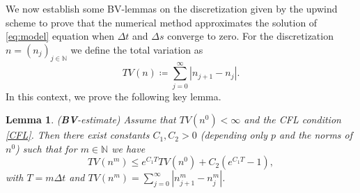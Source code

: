\documentclass[11pt,a4paper]{article}
\newcommand{\N}{\mathbb{N}}
\newtheorem{lemma}{Lemma}[section]
\begin{document}
We now establish some BV-lemmas on the discretization given by the upwind scheme to prove that the numerical method approximates the solution of \eqref{eq:model} equation when $\Delta t$ and $\Delta s$ converge to zero. For the discretization $n=(n_j)_{j\in\N}$ we define the total variation as
\begin{equation}
  TV(n)\coloneqq\sum_{j=0}^{\infty}|n_{j+1}-n_j|.  
\end{equation}
In this context, we prove the following key lemma.

\begin{lemma}{(\textbf{BV}-estimate)}
\label{BV-lem}
Assume that $TV(n^0)<\infty$ and the CFL condition \eqref{CFL}. Then there exist constants $C_1,C_2>0$ (depending only $p$ and the norms of $n^0$) such that for $m\in\N$ we have
\begin{equation}
    TV(n^m)\le e^{C_1T} TV(n^0)+C_2(e^{C_1T}-1),
    \label{BV_estimate}
\end{equation}
with  $T=m\Delta t$ and $TV(n^m)=\displaystyle\sum_{j=0}^\infty|n_{j+1}^{m}-n_{j}^{m}|$.
\end{lemma}
\end{document}
